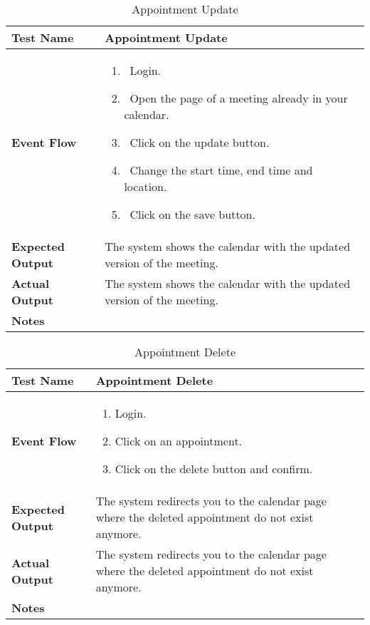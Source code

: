 \begin{table}[h]	
\centering
\def\arraystretch{1.5}
\begin{tabular}{|m{7cm}|m{7cm}|}
	\hline
	\textbf{Test Name}            &  Appointment Update  \\ \hline
	\textbf{Event Flow}             & 
		\begin{enumerate}
			\item~Login.
			\item~Open the page of a meeting already in your calendar.
			\item~Click on the update button.
			\item~Change the start time, end time and location.
			\item~Click on the save button.
		\end{enumerate}
	\\ \hline
	\textbf{Expected Output}  &  The system shows the calendar with the updated version of the meeting.   \\ \hline
	\textbf{Actual Output}       &  The system shows the calendar with the updated version of the meeting.   \\ \hline
	\textbf{Notes} & \\ \hline
\end{tabular}
\caption{Appointment Update}
\end{table}


\begin{table}[h]	
	\centering
	\def\arraystretch{1.5}
	\begin{tabular}{|m{7cm}|m{7cm}|}
		\hline
		\textbf{Test Name}            & Appointment Delete   \\ \hline
		\textbf{Event Flow}             & 
		\begin{enumerate}
			\item Login.
			\item Click on an appointment.
			\item Click on the delete button and confirm.
		\end{enumerate} \\ \hline
		\textbf{Expected Output}  &  The system redirects you to the calendar page where the deleted appointment do not exist anymore.  \\ \hline
		\textbf{Actual Output}       & The system redirects you to the calendar page where the deleted appointment do not exist anymore.    \\ \hline
		\textbf{Notes} & \\ \hline
	\end{tabular}
	\caption{Appointment Delete}
\end{table}



